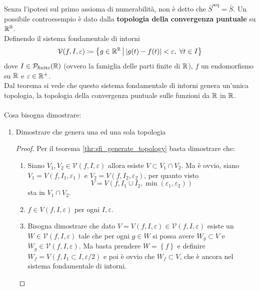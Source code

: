 \begin{remark}
	Senza l'ipotesi sul primo assioma di numerabilità, non è detto che $\bar{S}^\text{seq} = \bar{S}$. Un possibile controesempio è dato dalla \textbf{topologia della convergenza puntuale} su $\mathbb{R}^{\mathbb{R}}$. \\
	Definendo il sistema fondamentale di intorni 
	\begin{equation*}
		\mathcal{V}(f, I, \varepsilon) \coloneqq \left\{ g \in \mathbb{R}^{\mathbb{R}} \,\middle|\,  |g(t) - f(t)| < \varepsilon, \; \forall t \in I \right\}
	\end{equation*}
	dove $I \in \mathcal{P}_\text{finite}(\mathbb{R})$ (ovvero la famiglia delle parti finite di $\mathbb{R}$), $f$ un endomorfismo su $\mathbb{R}$ e $\varepsilon \in \mathbb{R}^+$. \\
	Dal teorema si vede che questo sistema fondamentale di intorni genera un'unica topologia, la topologia della convergenza puntuale sulle funzioni da $\mathbb{R}$ in $\mathbb{R}$.
	\\ \\
	Cosa bisogna dimostrare:
	\begin{enumerate}
		\item Dimostrare che genera una ed una sola topologia 
		\begin{proof}
			Per il teorema \ref{thr:sfi_generate_topology} basta dimostrare che:
			\begin{enumerate}
				\item Siano $V_1, V_2 \in \mathcal{V}(f,I,\varepsilon)$ allora esiste $V \subset V_1 \cap V_2$. Ma è ovvio, siano $V_1 = V(f, I_1, \varepsilon_1)$ e $V_2 = V(f, I_2, \varepsilon_2)$, per quanto visto 
				\begin{equation*}
				V = V(f, I_1 \cup I_2, \min(\varepsilon_1, \varepsilon_2))
				\end{equation*}
				sta in $V_1 \cap V_2$.
				\item $f \in V(f, I, \varepsilon)$ per ogni $I, \varepsilon$.
				\item Bisogna dimostrare che dato $V = V(f, I, \varepsilon)\in \mathcal{V}(f,I,\varepsilon)$ esiste un $W \in \mathcal{V}(f,I,\varepsilon)$ tale che per ogni $g \in W$ si possa avere $W_g \subset V$ e $W_g \in \mathcal{V}(f,I, \varepsilon)$. Ma basta prendere $W = \left\{f\right\}$ e definire $W_f = V(f, I_1 \subset I, \varepsilon/2)$ e poi è ovvio che $W_f \subset V$, che è ancora nel sistema fondamentale di intorni.

\end{enumerate}
\end{proof}
\end{enumerate}
\end{remark}

